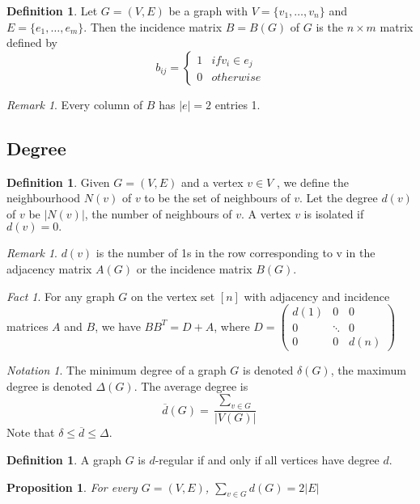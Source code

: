 \documentclass[10pt, fleqn, a4paper, landscape]{article}
\theoremstyle{plain} %
\newtheorem{pro}[thm]{Proposition}
\theoremstyle{remark} %
\newtheorem{rem}[thm]{Remark}
\newtheorem{nota}[thm]{Notation}
\newtheorem{fact}{Fact}
\theoremstyle{definition} %
\newtheorem{defi}[thm]{Definition}
\begin{document}
\begin{multicols}{3}
\begin{tiny}
\begin{defi}
Let $G = (V,E)$ be a graph with $V = \{v_1, \dots , v_n\}$ and $E = \{e_1, \dots , e_m\}$. Then the incidence matrix $B = B(G)$ of $G$ is the $n\times m$ matrix defined by \[b_{ij}=\begin{cases}1 & if v_i\in e_j\\ 0 & otherwise\end{cases}\]
\end{defi}
\addtocounter{thm}{1}
\begin{rem}
Every column of $B$ has $|e| = 2$ entries 1.
\end{rem}

\subsection{Degree}

\begin{defi}
Given $G = (V,E)$ and a vertex $v \in V$ , we define the neighbourhood $N(v)$ of $v$ to
be the set of neighbours of $v$. Let the degree $d(v)$ of $v$ be $|N(v)|$, the number of neighbours of $v$. A vertex $v$ is isolated if $d(v) = 0.$
\end{defi}
\begin{rem}
$d(v)$ is the number of 1s in the row corresponding to v in the adjacency matrix $A(G)$ or the incidence matrix $B(G)$.
\end{rem} 
\addtocounter{thm}{1}
\begin{fact}
For any graph $G$ on the vertex set $[n]$ with adjacency and incidence matrices $A$ and $B$, we have $BB^T = D + A$, where
$D=
\begin{pmatrix}
d(1) & 0 & 0  \\
0 & \ddots & 0  \\
0 & 0 & d(n)  
\end{pmatrix}
$  
\end{fact}

\begin{nota}
The minimum degree of a graph $G$ is denoted $\delta(G)$, the maximum degree is denoted $\Delta(G)$. The average degree is \[\overline{d}(G) =\frac{\sum_{v\in G}}{|V(G)|}\] Note that $\delta\le\overline{d}\le\Delta$.
\end{nota}

\begin{defi}
A graph $G$ is $d$-regular if and only if all vertices have degree $d$.
\end{defi}
\addtocounter{thm}{1}
\begin{pro}
For every $G = (V,E)$, $\sum_{v\in G}d(G)=2|E|$
\end{pro}


\end{tiny}
\end{multicols}
\end{document}
